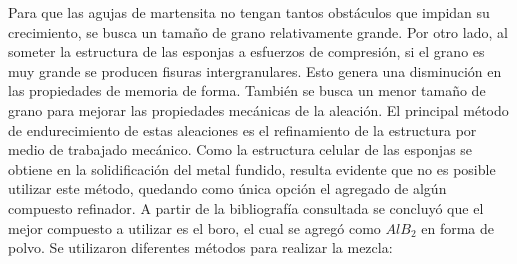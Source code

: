 \documentclass[a4paper,12pt,fleqn,twoside,openany]{book}
\begin{document}
Para que las agujas de martensita no tengan tantos obstáculos que impidan su crecimiento, se busca un tamaño de grano relativamente grande. Por otro 
lado, al someter la estructura de las esponjas a esfuerzos de compresión, si el grano es muy grande se producen fisuras intergranulares. Esto genera 
una disminución en las propiedades de memoria de forma. También se busca un menor tamaño de grano para mejorar las propiedades mecánicas de la aleación.
El principal método de endurecimiento de estas aleaciones es el refinamiento de la estructura por medio de trabajado mecánico. Como la estructura 
celular de las esponjas se obtiene en la solidificación del metal fundido, resulta evidente que no es posible utilizar este método, quedando como 
única opción el agregado de algún compuesto refinador. A partir de la bibliografía consultada se concluyó que el 
mejor compuesto a utilizar es el boro, el cual se agregó como $AlB_2$ en forma de polvo. Se utilizaron diferentes métodos para realizar la mezcla:
\end{document}
